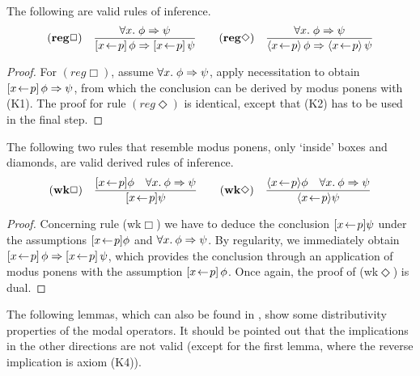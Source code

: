\begin{lem}[Regularity] \label{thm:regular}
  The following are valid rules of inference.
\[
  \NRule{reg\Box}{\forall x\bnd \phi \Rightarrow \psi}{\PDLBox{x\leteq p}{\phi} \Rightarrow \PDLBox{x\leteq p}{\psi}}
  \qquad
  \NRule{reg\Diamond}{\forall x\bnd \phi \Rightarrow \psi}{\PDLDmd{x\leteq p}{\phi} \Rightarrow \PDLDmd{x\leteq p}{\psi}}
\]
\end{lem}
\begin{proof}
  For $(reg\Box)$, assume $\forall x.\; \phi \Rightarrow \psi$, apply necessitation to obtain
  $[x\!\gets\! p]\,{\phi\Rightarrow\psi}$, from which the conclusion can be derived by modus
  ponens with (K1). The proof for rule $(reg\Diamond)$ is identical, except that (K2)
  has to be used in the final step.
\end{proof}


\begin{lem} \label{thm:wkbox-wkdmd}
  The following two rules that resemble modus ponens, only `inside'
  boxes and diamonds, are valid derived rules of inference. \\ 
\[
  \NRule{wk\Box}{[\xp]\phi \quad \forall x\bdot \phi \Rightarrow \psi}{[\xp] \psi}
  \qquad
  \NRule{wk\Diamond}{\langle\xp\rangle \phi \quad \forall x\bdot \phi \Rightarrow \psi }{\langle\xp\rangle \psi}
\]
\end{lem}
\begin{proof}
  Concerning  rule (wk$\Box$) we have to deduce the conclusion $[x \!\gets\! p]\psi$ under the
  assumptions $[x \!\gets\! p]\phi$ and $\forall x.\: \phi \Rightarrow \psi$. By regularity, we immediately
  obtain $[x\!\gets\! p]\,{\phi}  \Rightarrow [x\!\gets\! p]\,{\psi}$, which provides the
  conclusion through an application of modus ponens with the assumption
  $[x\!\gets\! p]\,{\phi}$. Once again, the proof of (wk$\Diamond$) is dual.
\end{proof}

The following lemmas, which can also be found in \cite{HarelKozen02}, show some
distributivity properties of the modal operators.  It should be pointed out that
the implications in the other directions are not valid (except for the first
lemma, where the reverse implication is axiom (K4)).

